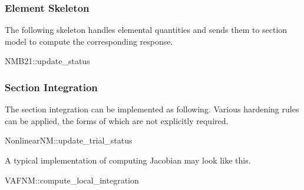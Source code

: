 \subsubsection{Element Skeleton}
The following skeleton handles elemental quantities and sends them to section model to compute the corresponding response.
\begin{cppcode}
NMB21::update_status
\end{cppcode}
\subsubsection{Section Integration}
The section integration can be implemented as following. Various hardening rules can be applied, the forms of which are not explicitly required.
\begin{cppcode}
NonlinearNM::update_trial_status
\end{cppcode}

A typical implementation of computing Jacobian may look like this.
\begin{cppcode}
VAFNM::compute_local_integration
\end{cppcode}